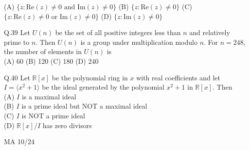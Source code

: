 \documentclass{article}
\begin{document}
																																			     \noindent (A) $\{z : \text{Re}(z) \neq 0 \text{ and } \text{Im}(z) \neq 0 \}$ \hspace{5.5cm} (B)  $\{z : \text{Re}(z) \neq 0 \}$
																																			     \newline \noindent (C) $\{z : \text{Re}(z) \neq 0 \text{ or } \text{Im}(z) \neq 0 \}$\hspace{6cm}  (D) $\{z : \text{Im}(z) \neq 0 \}$
																																			     \vspace{1em}

																																			     Q.39 Let $U(n)$ be the set of all positive integers less than $n$ and relatively prime to $n$. Then $U(n)$ is a group under multiplication modulo $n$. For $n = 248$, the number of elements in $U(n)$ is\\
																																			     \newline
																																			     (A) 60 \hspace{2cm}(B) 120 \hspace{2cm} (C) 180 \hspace{2cm} (D) 240

																																			     \vspace{1em}

																																			     Q.40 \quad Let $\mathbb{R}[x]$ be the polynomial ring in $x$ with real coefficients and let $I = \langle x^2 + 1 \rangle$ be the ideal generated by the polynomial $x^2 + 1$ in $\mathbb{R}[x]$. Then\\
																																			     \newline
																																			     (A) $I$ is a maximal ideal\\
																																			     (B) $I$ is a prime ideal but NOT a maximal ideal\\
																																			     (C) $I$ is NOT a prime ideal\\
																																			     (D) $\mathbb{R}[x]/I$ has zero divisors
																																			     \vspace{15em}
																																			     \begin{center}
																																			         {MA 10/24}
																																				 \end{center}

																																				 \newpage
\end{document}
